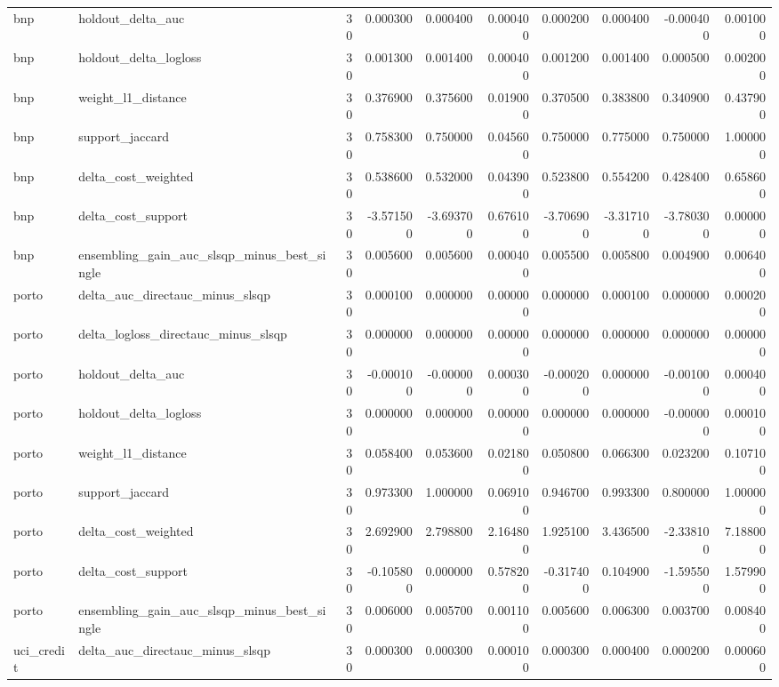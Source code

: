 \begin{landscape}
\begin{longtable}{llrrrrrrrr}
bnp & holdout\_delta\_auc & 30 & 0.000300 & 0.000400 & 0.000400 & 0.000200 & 0.000400 & -0.000400 & 0.001000 \\
bnp & holdout\_delta\_logloss & 30 & 0.001300 & 0.001400 & 0.000400 & 0.001200 & 0.001400 & 0.000500 & 0.002000 \\
bnp & weight\_l1\_distance & 30 & 0.376900 & 0.375600 & 0.019000 & 0.370500 & 0.383800 & 0.340900 & 0.437900 \\
bnp & support\_jaccard & 30 & 0.758300 & 0.750000 & 0.045600 & 0.750000 & 0.775000 & 0.750000 & 1.000000 \\
bnp & delta\_cost\_weighted & 30 & 0.538600 & 0.532000 & 0.043900 & 0.523800 & 0.554200 & 0.428400 & 0.658600 \\
bnp & delta\_cost\_support & 30 & -3.571500 & -3.693700 & 0.676100 & -3.706900 & -3.317100 & -3.780300 & 0.000000 \\
bnp & ensembling\_gain\_auc\_slsqp\_minus\_best\_single & 30 & 0.005600 & 0.005600 & 0.000400 & 0.005500 & 0.005800 & 0.004900 & 0.006400 \\
porto & delta\_auc\_directauc\_minus\_slsqp & 30 & 0.000100 & 0.000000 & 0.000000 & 0.000000 & 0.000100 & 0.000000 & 0.000200 \\
porto & delta\_logloss\_directauc\_minus\_slsqp & 30 & 0.000000 & 0.000000 & 0.000000 & 0.000000 & 0.000000 & 0.000000 & 0.000000 \\
porto & holdout\_delta\_auc & 30 & -0.000100 & -0.000000 & 0.000300 & -0.000200 & 0.000000 & -0.001000 & 0.000400 \\
porto & holdout\_delta\_logloss & 30 & 0.000000 & 0.000000 & 0.000000 & 0.000000 & 0.000000 & -0.000000 & 0.000100 \\
porto & weight\_l1\_distance & 30 & 0.058400 & 0.053600 & 0.021800 & 0.050800 & 0.066300 & 0.023200 & 0.107100 \\
porto & support\_jaccard & 30 & 0.973300 & 1.000000 & 0.069100 & 0.946700 & 0.993300 & 0.800000 & 1.000000 \\
porto & delta\_cost\_weighted & 30 & 2.692900 & 2.798800 & 2.164800 & 1.925100 & 3.436500 & -2.338100 & 7.188000 \\
porto & delta\_cost\_support & 30 & -0.105800 & 0.000000 & 0.578200 & -0.317400 & 0.104900 & -1.595500 & 1.579900 \\
porto & ensembling\_gain\_auc\_slsqp\_minus\_best\_single & 30 & 0.006000 & 0.005700 & 0.001100 & 0.005600 & 0.006300 & 0.003700 & 0.008400 \\
uci\_credit & delta\_auc\_directauc\_minus\_slsqp & 30 & 0.000300 & 0.000300 & 0.000100 & 0.000300 & 0.000400 & 0.000200 & 0.000600 \\

\end{longtable}
\end{landscape}
